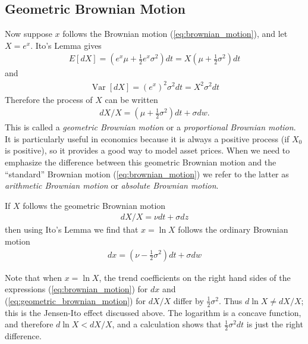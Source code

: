 \documentclass[\topdir/lecture\_notes.tex]{subfiles}
\begin{document}
\subsection{Geometric Brownian Motion}
Now suppose $x$ follows the Brownian motion (\ref{eq:brownian_motion}), and let $X=e^{x}$. Ito's Lemma gives
\begin{align*}
E[dX]=\left(e^{x} \mu+\frac{1}{2} e^{x} \sigma^{2}\right) dt=X\left(\mu+\frac{1}{2} \sigma^{2}\right) dt
\end{align*}
and
\begin{align*}
\operatorname{Var}[dX]=\left(e^{x}\right)^{2} \sigma^{2} dt=X^{2} \sigma^{2} dt
\end{align*}
Therefore the process of $X$ can be written
\begin{align*}
dX / X=\left(\mu+\frac{1}{2} \sigma^{2}\right) dt+\sigma dw .
\end{align*}
This is called a \emph{geometric Brownian motion} or a \emph{proportional Brownian motion}. It is particularly useful in economics because it is always a positive process (if $X_0$ is positive), so it provides a good way to model asset prices. When we need to emphasize the difference between this geometric Brownian motion and the ``standard'' Brownian motion (\ref{eq:brownian_motion}) we refer to the latter as \emph{arithmetic Brownian motion} or \emph{absolute Brownian motion}. 

If $X$ follows the geometric Brownian motion
\begin{align}
dX / X=\nu dt+\sigma d z \label{eq:geometric_brownian_motion}
\end{align}
then using Ito's Lemma we find that $x=\ln X$ follows the ordinary Brownian motion
\begin{align*}
dx=\left(\nu-\frac{1}{2} \sigma^{2}\right) dt+\sigma dw
\end{align*}

Note that when $x=\ln X$, the trend coefficients on the right hand sides of the expressions (\ref{eq:brownian_motion}) for $dx$ and (\ref{eq:geometric_brownian_motion}) for $dX / X$ differ by $\frac{1}{2} \sigma^{2}$. Thus $d \ln X \neq dX / X$; this is the Jensen-Ito effect discussed above. The logarithm is a concave function, and therefore $d \ln X<dX / X$, and a calculation shows that $\frac{1}{2} \sigma^{2} dt$ is just the right difference.
\end{document}
